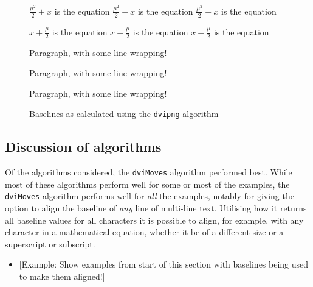 \documentclass[]{article}
\providecommand{\tightlist}{%
  \setlength{\itemsep}{0pt}\setlength{\parskip}{0pt}}
\begin{document}
\begin{figure}
\begin{center}
\vspace{0.3cm}
\settodepth{\dvidepth} {$\frac{\mu^2}{2} + x$ is the equation}%
\settowidth{\dviwidth} {$\frac{\mu^2}{2} + x$ is the equation}%
\raisebox{\dimexpr -\dvidepth+0.0520833333333333in}{\makebox[0in][l]{\rule{\dviwidth}{.1pt}}}%
$\frac{\mu^2}{2} + x$ is the equation

\vspace{0.3cm}
\settodepth{\dvidepth} {$x + \frac{\mu}{2}$ is the equation}%
\settowidth{\dviwidth} {$x + \frac{\mu}{2}$ is the equation}%
\raisebox{\dimexpr -\dvidepth+0.0520833333333333in}{\makebox[0in][l]{\rule{\dviwidth}{.1pt}}}%
$x + \frac{\mu}{2}$ is the equation

\vspace{0.3cm}
\settodepth{\dvidepth} {\begin{minipage}{1in}Paragraph, with some line wrapping!\end{minipage}}%
\settowidth{\dviwidth} {\begin{minipage}{1in}Paragraph, with some line wrapping!\end{minipage}}%
\raisebox{\dimexpr -\dvidepth+0.208333333333333in}{\makebox[0in][l]{\rule{\dviwidth}{.1pt}}}%
\begin{minipage}{1in}Paragraph, with some line wrapping!\end{minipage}

\vspace{0.3cm}
\end{center}
\caption{Baselines as calculated using the \texttt{dvipng} algorithm}
\end{figure}

\subsection{Discussion of algorithms}\label{discussion-of-algorithms}

Of the algorithms considered, the \texttt{dviMoves} algorithm performed
best. While most of these algorithms perform well for some or most of
the examples, the \texttt{dviMoves} algorithm performs well for
\emph{all} the examples, notably for giving the option to align the
baseline of \emph{any} line of multi-line text. Utilising how it returns
all baseline values for all characters it is possible to align, for
example, with any character in a mathematical equation, whether it be of
a different size or a superscript or subscript.

\begin{itemize}
\tightlist
\item
  {[}Example: Show examples from start of this section with baselines
  being used to make them aligned!{]}
\end{itemize}
\end{document}
